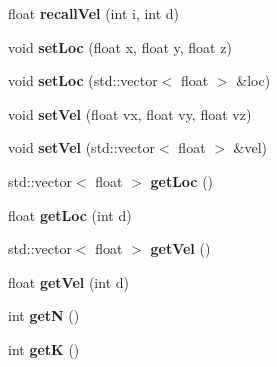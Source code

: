 \begin{DoxyCompactItemize}
\item 
\hypertarget{classParticle_a48d92c456f0a33024aa9debbf103b0a2}{float {\bfseries recall\+Vel} (int i, int d)}\label{classParticle_a48d92c456f0a33024aa9debbf103b0a2}

\item 
\hypertarget{classParticle_a40f3f0ac6f374d2bab417df39412f565}{void {\bfseries set\+Loc} (float x, float y, float z)}\label{classParticle_a40f3f0ac6f374d2bab417df39412f565}

\item 
\hypertarget{classParticle_a30c7e17b4910676a4ca6754b506d63bb}{void {\bfseries set\+Loc} (std\+::vector$<$ float $>$ \&loc)}\label{classParticle_a30c7e17b4910676a4ca6754b506d63bb}

\item 
\hypertarget{classParticle_ae8c7428281b15de58c82640df40b8806}{void {\bfseries set\+Vel} (float vx, float vy, float vz)}\label{classParticle_ae8c7428281b15de58c82640df40b8806}

\item 
\hypertarget{classParticle_ad23fb160cdba725a3ce9b0b884154459}{void {\bfseries set\+Vel} (std\+::vector$<$ float $>$ \&vel)}\label{classParticle_ad23fb160cdba725a3ce9b0b884154459}

\item 
\hypertarget{classParticle_a023e86b289eb9061c76686f74a6a4031}{std\+::vector$<$ float $>$ {\bfseries get\+Loc} ()}\label{classParticle_a023e86b289eb9061c76686f74a6a4031}

\item 
\hypertarget{classParticle_aa79ae074e71a56da331196509393dec7}{float {\bfseries get\+Loc} (int d)}\label{classParticle_aa79ae074e71a56da331196509393dec7}

\item 
\hypertarget{classParticle_a3058e09a4879fb0e7362ec96bcc02568}{std\+::vector$<$ float $>$ {\bfseries get\+Vel} ()}\label{classParticle_a3058e09a4879fb0e7362ec96bcc02568}

\item 
\hypertarget{classParticle_ab1a5c27a96fcf00e85b2c593b5924c54}{float {\bfseries get\+Vel} (int d)}\label{classParticle_ab1a5c27a96fcf00e85b2c593b5924c54}

\item 
\hypertarget{classParticle_a74f1961aa25ac79a383657d99231e405}{int {\bfseries get\+N} ()}\label{classParticle_a74f1961aa25ac79a383657d99231e405}

\item 
\hypertarget{classParticle_a8584ae304307db472805d7c01a925d8e}{int {\bfseries get\+K} ()}\label{classParticle_a8584ae304307db472805d7c01a925d8e}


\end{DoxyCompactItemize}
